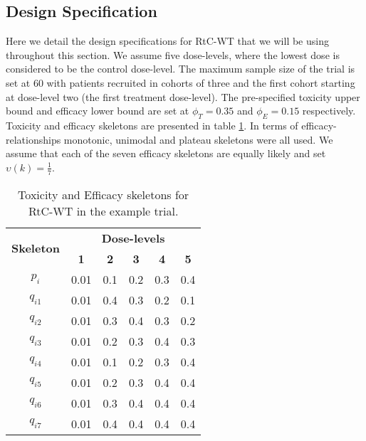  \subsection{Design Specification}
 \label{WT:Design-Spec}
 
 Here we detail the design specifications for RtC-WT that we will be using throughout this section. We assume five dose-levels, where the lowest dose is considered to be the control dose-level. The maximum sample size of the trial is set at 60 with patients recruited in cohorts of three and the first cohort starting at dose-level two (the first treatment dose-level). The pre-specified toxicity upper bound and efficacy lower bound are set at $\phi_T = 0.35$ and $\phi_E = 0.15$ respectively. Toxicity and efficacy skeletons are presented in table \ref{tab_wt:tox-eff-skeleton}. In terms of efficacy-relationships monotonic, unimodal and plateau skeletons were all used. We assume that each of the seven efficacy skeletons are equally likely and set $\upsilon(k) = \frac{1}{7}$. 
 

 \begin{table}[!h]
 	\centering
 	\caption{Toxicity and Efficacy skeletons for RtC-WT in the example trial.}
 	\label{tab_wt:tox-eff-skeleton}
 	\begin{tabular}{c|ccccc}
 		\hline
 		\multicolumn{1}{c|}{\multirow{2}{*}{\textbf{Skeleton}}} & \multicolumn{5}{c}{\textbf{Dose-levels}}                       \\
 		\multicolumn{1}{c|}{}                                   & \textbf{1} & \textbf{2} & \textbf{3} & \textbf{4} & \textbf{5} \\ \hline
 		$p_i$    & 0.01 & 0.1 & 0.2 & 0.3 & 0.4 \\
 		$q_{i1}$ & 0.01 & 0.4 & 0.3 & 0.2 & 0.1 \\
 		$q_{i2}$ & 0.01 & 0.3 & 0.4 & 0.3 & 0.2 \\
 		$q_{i3}$ & 0.01 & 0.2 & 0.3 & 0.4 & 0.3 \\
 		$q_{i4}$ & 0.01 & 0.1 & 0.2 & 0.3 & 0.4 \\
 		$q_{i5}$ & 0.01 & 0.2 & 0.3 & 0.4 & 0.4 \\
 		$q_{i6}$ & 0.01 & 0.3 & 0.4 & 0.4 & 0.4 \\
 		$q_{i7}$ & 0.01 & 0.4 & 0.4 & 0.4 & 0.4 \\ \hline
 	\end{tabular}
 \end{table}
 
